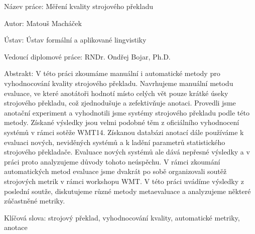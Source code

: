 Název práce:
Měření kvality strojového překladu

Autor:
Matouš Macháček

Ústav:
Ústav formální a aplikované lingvistiky

Vedoucí diplomové práce:
RNDr. Ondřej Bojar, Ph.D.

Abstrakt: V této práci zkoumáme manuální i automatické metody pro vyhodnocování
kvality strojového překladu. Navrhujeme manuální metodu evaluace, ve které
anotátoři hodnotí místo celých vět pouze krátké úseky strojového překladu, což
zjednodušuje a zefektivňuje anotaci. Provedli jsme anotační experiment a
vyhodnotili jsme systémy strojového překladu podle této metody. Získané
výsledky jsou velmi podobné těm z oficiálního vyhodnocení systémů v rámci
sotěže WMT14. Získanou databázi anotací dále používáme k evaluaci nových,
neviděných systémů a k ladění parametrů statistického strojového překladače.
Evaluace nových systémů ale dává nepřesné výsledky a v práci proto analyzujeme
důvody tohoto neúspěchu. V rámci zkoumání automatických metod \mbox{evaluace} jsme
dvakrát po sobě organizovali soutěž strojových metrik v rámci workshopu WMT.  V
této práci uvádíme výsledky z poslední soutže, diskutujeme různé metody
metaevaluace a analyzujeme některé zúčastněné metriky. 

Klíčová slova:
strojový překlad, vyhodnocování kvality, automatické metriky, anotace
